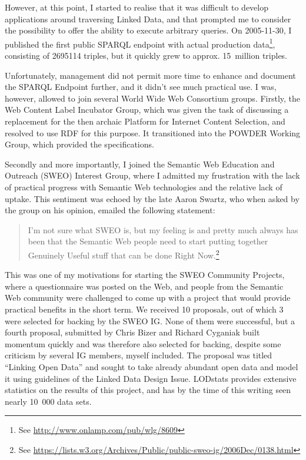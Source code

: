 However, at this point, I started to realise that it was difficult to
develop applications around traversing Linked Data, and that
prompted me to consider the possibility to offer the ability to
execute arbitrary queries. On 2005-11-30, I published the first public
SPARQL endpoint with actual production data\footnote{See
  \url{http://www.onlamp.com/pub/wlg/8609}}, consisting of 2695114
triples, but it quickly grew to approx. 15~million triples.

Unfortunately, management did not permit more time to enhance and document the
SPARQL Endpoint further, and it didn't see much practical use. 
I was, however, allowed to join several World Wide Web Consortium
groups. Firstly, the Web Content Label Incubator Group, which was
given the task of discussing a replacement for the then archaic Platform for
Internet Content Selection, and resolved to use RDF for this
purpose. It transitioned into the POWDER Working Group, which
provided the specifications. 

Secondly and more importantly, I joined the Semantic Web Education and Outreach
(SWEO) Interest Group, where I admitted my frustration with the lack
of practical progress with Semantic Web technologies and the relative
lack of uptake. This sentiment was echoed by the late Aaron Swartz,
who when asked by the group on his opinion, emailed the
following statement:
\begin{quote}
I'm not sure what SWEO is, but my feeling is and pretty much always
has been that the Semantic Web people need to start putting together
Genuinely Useful stuff that can be done Right Now.\footnote{See
  \url{https://lists.w3.org/Archives/Public/public-sweo-ig/2006Dec/0138.html}}
\end{quote}

This was one of my motivations for starting the SWEO Community
Projects, where a questionnaire was posted on the Web, and people from
the Semantic Web community were challenged to come up with a project
that would provide practical benefits in the short term. We received
10 proposals, out of which 3 were selected for backing by the SWEO
IG. None of them were successful, but a fourth proposal, submitted by
Chris Bizer and Richard Cyganiak built momentum quickly and was
therefore also selected for backing, despite some criticism by several
IG members, myself included. The proposal was titled ``Linking Open
Data'' and sought to take already abundant open data and model it
using guidelines of the Linked Data Design
Issue\cite{linkeddataissue}. LODstats\cite{auer2012lodstats} provides
extensive statistics on the results of this project, and has by the
time of this writing seen nearly 10~000 data sets.

